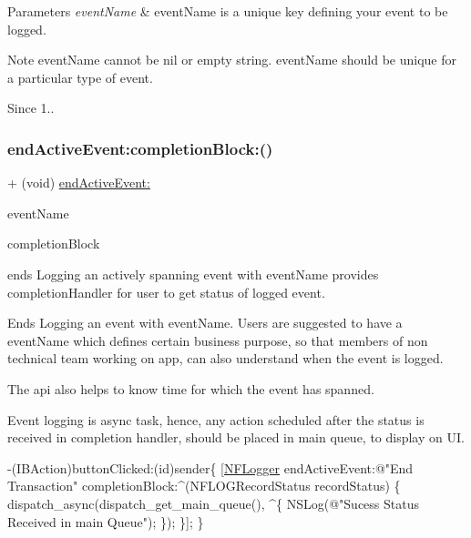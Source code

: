 \begin{DoxyParams}{Parameters}
{\em event\+Name} & event\+Name is a unique key defining your event to be logged. \\
\hline
\end{DoxyParams}
\begin{DoxyNote}{Note}
event\+Name cannot be nil or empty string. event\+Name should be unique for a particular type of event. 
\end{DoxyNote}
\begin{DoxySince}{Since}
1.. 
\end{DoxySince}
\mbox{\label{interface_n_f_logger_a72b51800e587c99090a5b8ce8788fa14}} 
\subsubsection{\texorpdfstring{end\+Active\+Event\+:completion\+Block\+:()}{endActiveEvent:completionBlock:()}}
{\footnotesize\ttfamily + (void) \hyperlink{interface_n_f_logger_a6cac38d011820ec21dc314c7a4d4aaf4}{end\+Active\+Event\+:} \begin{DoxyParamCaption}\item[{(N\+S\+String $\ast$)}]{event\+Name }\item[{completionBlock:(void($^\wedge$)(N\+F\+L\+O\+G\+Record\+Status record\+Status))}]{completion\+Block }\end{DoxyParamCaption}}



ends Logging an actively spanning event with event\+Name provides completion\+Handler for user to get status of logged event. 

Ends Logging an event with event\+Name. Users are suggested to have a event\+Name which defines certain business purpose, so that members of non technical team working on app, can also understand when the event is logged.

The api also helps to know time for which the event has spanned.

Event logging is async task, hence, any action scheduled after the status is received in completion handler, should be placed in main queue, to display on UI.


\begin{DoxyCode}
-(IBAction)buttonClicked:(\textcolor{keywordtype}{id})sender\{
 [\hyperlink{interface_n_f_logger}{NFLogger} endActiveEvent:\textcolor{stringliteral}{@"End Transaction"} completionBlock:^(NFLOGRecordStatus recordStatus) \{
      dispatch\_async(dispatch\_get\_main\_queue(), ^\{
          NSLog(\textcolor{stringliteral}{@"Sucess Status Received in main Queue"});
       \});
  \}];
\}
\end{DoxyCode}
 
